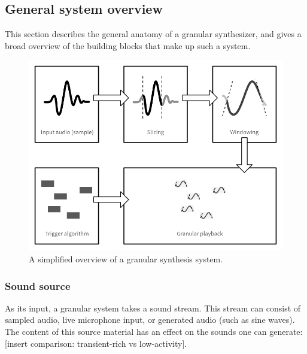 \documentclass[10pt, twocolumn]{IEEEtran}
\begin{document}
\subsection{General system overview}
This section describes the general anatomy of a granular synthesizer, and gives a broad overview of the building blocks that make up such a system. 

\begin{figure}[ht!]
	\includegraphics[width=\linewidth]{GranularDiagram.png}
	\caption{A simplified overview of a granular synthesis system.}
	\label{fig:block_diagram}
\end{figure}

\subsubsection{Sound source}
As its input, a granular system takes a sound stream. This stream can consist of sampled audio, live microphone input, or generated audio (such as sine waves). The content of this source material has an effect on the sounds one can generate: [insert comparison: transient-rich vs low-activity].
\end{document}
